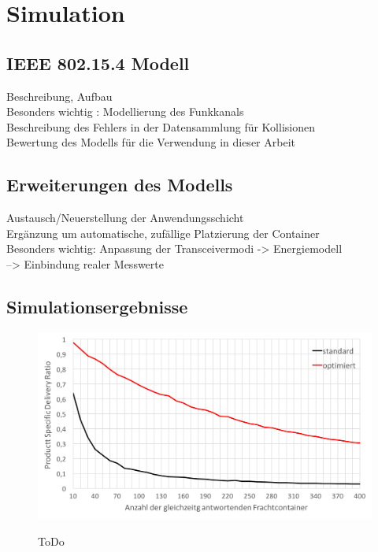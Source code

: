 \chapter{Simulation}\label{kap:simulation}
\section{IEEE 802.15.4 Modell}\label{kap:simulation_sec:beschreibung}
Beschreibung, Aufbau \\
Besonders wichtig : Modellierung des Funkkanals \\
Beschreibung des Fehlers in der Datensammlung für Kollisionen \\
Bewertung des Modells für die Verwendung in dieser Arbeit \\

\section{Erweiterungen des Modells}\label{kap:simulation_sec:erweiterung}
Austausch/Neuerstellung der Anwendungsschicht \\
Ergänzung um automatische, zufällige Platzierung der Container \\
Besonders wichtig: Anpassung der Transceivermodi -> Energiemodell \\
--> Einbindung realer Messwerte \\

\section{Simulationsergebnisse}\label{kap:simulation_sec:ergebnisse}
\begin{figure}[bth]
        \myfloatalign
        {\includegraphics[width=1\linewidth]{gfx/Diag_Durchsatz_10_400}} 
        \caption[Durchsatz]{ToDo}\label{fig:diag_durchsatz_10_400}
\end{figure}

